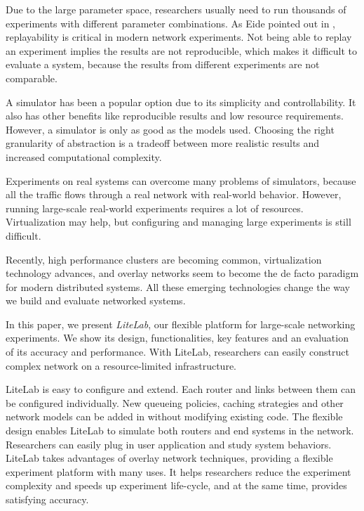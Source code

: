 \documentclass[conference]{IEEEtran}
\begin{document}
Due to the large parameter space, researchers usually need to run
thousands of experiments with different parameter combinations. As
Eide pointed out in \cite{Eide:2010}, replayability is critical in
modern network experiments.  Not being able to replay an experiment
implies the results are not reproducible, which makes it difficult to
evaluate a system, because the results from different experiments are
not comparable.

A simulator has been a popular option due to its simplicity and
controllability. It also has other benefits like reproducible results
and low resource requirements. However, a simulator is only as good as
the models used. Choosing the right granularity of abstraction is a
tradeoff between more realistic results and increased computational
complexity.



Experiments on real systems can overcome many problems of simulators,
because all the traffic flows through a real network with real-world
behavior. However, running large-scale real-world experiments requires
a lot of resources. Virtualization may help, but configuring and
managing large experiments is still difficult.







Recently, high performance clusters are becoming common,
virtualization technology advances, and overlay networks seem to
become the de facto paradigm for modern distributed systems. All these
emerging technologies change the way we build and evaluate networked
systems.




In this paper, we present \emph{LiteLab}, our flexible platform for
large-scale networking experiments. We show its design,
functionalities, key features and an evaluation of its accuracy and
performance. With LiteLab, researchers can easily construct complex
network on a resource-limited infrastructure.



LiteLab is easy to configure and extend. Each router and links between
them can be configured individually. New queueing policies, caching
strategies and other network models can be added in without modifying
existing code.  The flexible design enables LiteLab to simulate both
routers and end systems in the network. Researchers can easily plug in
user application and study system behaviors. LiteLab takes advantages
of overlay network techniques, providing a flexible experiment
platform with many uses.  It helps researchers reduce the experiment
complexity and speeds up experiment life-cycle, and at the same time,
provides satisfying accuracy.
\end{document}

